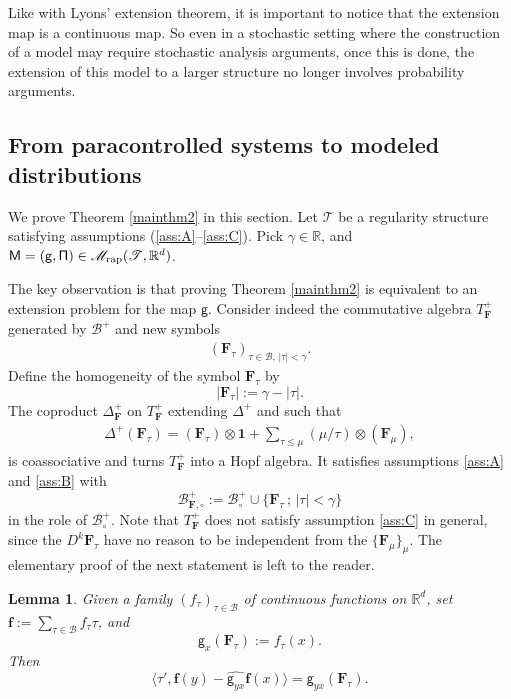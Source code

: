 \documentclass[11pt]{article}
\numberwithin{equation}{section}
\theoremstyle{plain}
\newtheorem{lem}[thm]{Lemma}
\theoremstyle{definition}
\newcommand{\unit}{\mathbf{1}}
\newcommand{\bsf}{\boldsymbol{f}}
\newcommand{\rap}{\mathrm{rap}}
\newcommand{\sfg}{\mathsf{g}}
\newcommand{\bsF}{\boldsymbol{F}}
\newcommand{\scrM}{\mathscr{M}}
\newcommand{\scrT}{\mathscr{T}}
\newcommand{\bbR}{\mathbb{R}}
\newcommand{\mcB}{\mathcal{B}}
\begin{document}
Like with Lyons' extension theorem, it is important to notice that the extension map is a continuous map. So even in a stochastic setting where the construction of a model may require stochastic analysis arguments, once this is done, the extension of this model to a larger structure no longer involves probability arguments.

\subsection{From paracontrolled systems to modeled distributions}
\label{SubsectionPCtoModelledDistributions}

We prove Theorem \ref{mainthm2} in this section. Let $\scrT$ be a regularity structure satisfying assumptions (\ref{ass:A}--\ref{ass:C}). Pick $\gamma\in\bbR$, and ${\sf M = (g, \Pi)}\in\scrM_\rap(\scrT,\bbR^d)$.

The key observation is that proving Theorem \ref{mainthm2} is equivalent to an extension problem for the map $\sfg$. Consider indeed the commutative algebra $T_{\bsF}^+$ generated by $\mcB^+$ and new symbols
\begin{align*}
(\bsF_\tau)_{\tau\in\mcB,\, |\tau|<\gamma}.
\end{align*}
Define the homogeneity of the symbol $\bsF_\tau$ by
\[
|\bsF_\tau| := \gamma - |\tau|.
\]
The coproduct $\Delta^+_{\bsF}$ on $T_{\bsF}^+$ extending $\Delta^+$ and such that
\begin{align}\label{eq:def of Delta F/tau}
\Delta^+(\bsF_\tau) = (\bsF_\tau)\otimes\unit+\sum_{\tau\le\mu}(\mu/\tau)\otimes(\bsF_\mu),
\end{align}
is coassociative and turns $T^+_{\bsF}$ into a Hopf algebra. It satisfies assumptions \eqref{ass:A} and \eqref{ass:B} with
\[
\mcB^+_{{\bsF},\circ} := \mcB^+_\circ\cup\big\{{\bsF}_\tau\,;\,\vert\tau\vert<\gamma\big\}
\]
in the role of $\mcB^+_\circ$.
Note that $T_{\bsF}^+$ does not satisfy assumption \eqref{ass:C} in general, since the $D^k\bsF_\tau$ have no reason to be independent from the $\{\bsF_\mu\}_\mu$. The elementary proof of the next statement is left to the reader.

\begin{lem}\label{lem: model on Ftau is equiv to MD}
Given a family $(f_\tau)_{\tau\in\mcB}$ of continuous functions on $\bbR^d$, set $\bsf := \sum_{\tau\in\mcB}f_\tau\tau$, and
\[
\sfg_x(\bsF_\tau) := f_\tau(x) .
\]
Then
\[
\big\langle \tau', \bsf(y) - \widehat{\sfg_{yx}}\bsf(x)\big\rangle = \sfg_{yx}(\bsF_\tau).
\]
\end{lem}
\end{document}
